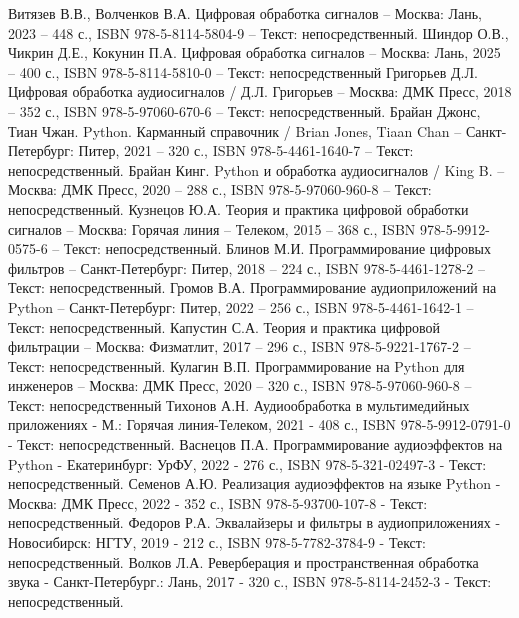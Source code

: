 
\begin{thebibliography}{9}
	
	 Витязев В.В., Волченков В.А. Цифровая обработка сигналов – Москва: Лань, 2023 – 448 с., ISBN 978-5-8114-5804-9 – Текст: непосредственный.
	 Шиндор О.В., Чикрин Д.Е., Кокунин П.А. Цифровая обработка сигналов – Москва: Лань, 2025 – 400 с., ISBN 978-5-8114-5810-0 – Текст: непосредственный
	 Григорьев Д.Л. Цифровая обработка аудиосигналов / Д.Л. Григорьев – Москва: ДМК Пресс, 2018 – 352 с., ISBN 978-5-97060-670-6 – Текст: непосредственный.
	 Брайан Джонс, Тиан Чжан. Python. Карманный справочник / Brian Jones, Tiaan Chan – Санкт-Петербург: Питер, 2021 – 320 с., ISBN 978-5-4461-1640-7 – Текст: непосредственный.
	 Брайан Кинг. Python и обработка аудиосигналов / King B. – Москва: ДМК Пресс, 2020 – 288 с., ISBN 978-5-97060-960-8 – Текст: непосредственный.
	 Кузнецов Ю.А. Теория и практика цифровой обработки сигналов – Москва: Горячая линия – Телеком, 2015 – 368 с., ISBN 978-5-9912-0575-6 – Текст: непосредственный.
	 Блинов М.И. Программирование цифровых фильтров – Санкт-Петербург: Питер, 2018 – 224 с., ISBN 978-5-4461-1278-2 – Текст: непосредственный.
	 Громов В.А. Программирование аудиоприложений на Python – Санкт-Петербург: Питер, 2022 – 256 с., ISBN 978-5-4461-1642-1 – Текст: непосредственный.
	 Капустин С.А. Теория и практика цифровой фильтрации – Москва: Физматлит, 2017 – 296 с., ISBN 978-5-9221-1767-2 – Текст: непосредственный.
	 Кулагин В.П. Программирование на Python для инженеров – Москва: ДМК Пресс, 2020 – 320 с., ISBN 978-5-97060-960-8 – Текст: непосредственный
	 Тихонов А.Н. Аудиообработка в мультимедийных приложениях - М.: Горячая линия-Телеком, 2021 - 408 с., ISBN 978-5-9912-0791-0 - Текст: непосредственный.
	 Васнецов П.А. Программирование аудиоэффектов на Python - Екатеринбург: УрФУ, 2022 - 276 с., ISBN 978-5-321-02497-3 - Текст: непосредственный.
	 Семенов А.Ю. Реализация аудиоэффектов на языке Python - Москва: ДМК Пресс, 2022 - 352 с., ISBN 978-5-93700-107-8 - Текст: непосредственный.
	 Федоров Р.А. Эквалайзеры и фильтры в аудиоприложениях - Новосибирск: НГТУ, 2019 - 212 с., ISBN 978-5-7782-3784-9 - Текст: непосредственный.
	 Волков Л.А. Реверберация и пространственная обработка звука - Санкт-Петербург.: Лань, 2017 - 320 с., ISBN 978-5-8114-2452-3 - Текст: непосредственный.

\end{thebibliography}
